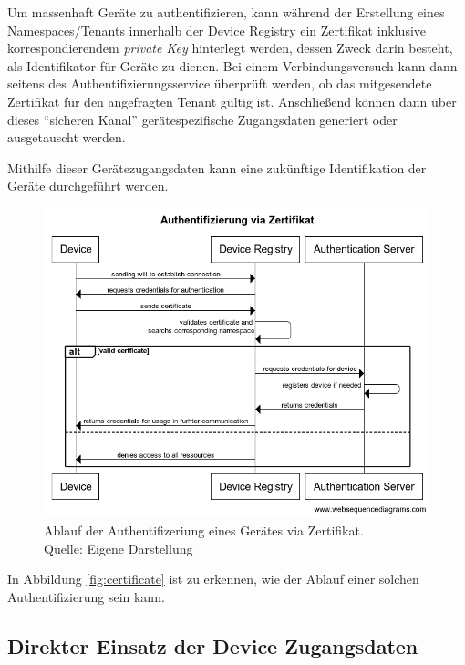 Um massenhaft Geräte zu authentifizieren, kann während der Erstellung eines Namespaces/Tenants innerhalb der Device Registry ein Zertifikat inklusive korrespondierendem \textit{private Key} hinterlegt werden, dessen Zweck darin besteht, als Identifikator für Geräte zu dienen. Bei einem Verbindungsversuch kann dann seitens des Authentifizierungsservice überprüft werden, ob das mitgesendete Zertifikat für den angefragten Tenant gültig ist. Anschließend können dann über dieses \enquote{sicheren Kanal} gerätespezifische Zugangsdaten generiert oder ausgetauscht werden.

Mithilfe dieser Gerätezugangsdaten kann eine zukünftige Identifikation der Geräte durchgeführt werden.

\begin{figure}[ht]
    \centering
    \includegraphics[width=1.0\linewidth]{img/device_authentication.png}
    \caption[Ablauf der Authentifizierung via Zertifikat]{Ablauf der Authentifizeriung eines Gerätes via Zertifikat.\\ Quelle: Eigene Darstellung}
    \label{fig:certificate}
\end{figure}

In Abbildung \vref{fig:certificate} ist zu erkennen, wie der Ablauf einer solchen Authentifizierung sein kann.

\subsection{Direkter Einsatz der Device Zugangsdaten}
\label{sec:credentials}

